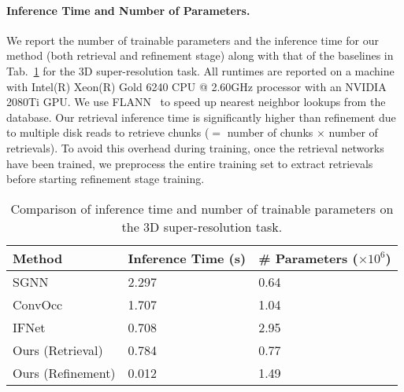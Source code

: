 \paragraph{Inference Time and Number of Parameters.}
We report the number of trainable parameters and the inference time for our method (both retrieval and refinement stage) along with that of the baselines in Tab.~\ref{tab:inference_params} for the 3D super-resolution task. All runtimes are reported on a machine with Intel(R) Xeon(R) Gold 6240 CPU @ 2.60GHz processor with an NVIDIA 2080Ti GPU. We use FLANN~\cite{muja2009fast} to speed up nearest neighbor lookups from the database. Our retrieval inference time is significantly higher than refinement due to multiple disk reads to retrieve chunks ($=$ number of chunks $\times$ number of retrievals). To avoid this overhead during training, once the retrieval networks have been trained, we preprocess the entire training set to extract retrievals before starting refinement stage training.
{
\begin{table}
    \centering
    \small
    \begin{tabular}{|l|l|l|} 
    \hline
    Method & Inference Time (s) & \# Parameters ($\times10^6$) \\
    \hline
    SGNN~\cite{dai2020sg} & 2.297 & 0.64\\
    ConvOcc~\cite{peng2020convolutional} & 1.707 & 1.04\\
    IFNet~\cite{chibane2020implicit} & 0.708 & 2.95\\
    Ours (Retrieval) & 0.784 & 0.77\\
    Ours (Refinement) & 0.012 & 1.49\\
    \hline
    \end{tabular}
    \caption{Comparison of inference time and number of trainable parameters on the 3D super-resolution task.}
    \vspace{-0.25cm}
    \label{tab:inference_params}
\end{table}
}

